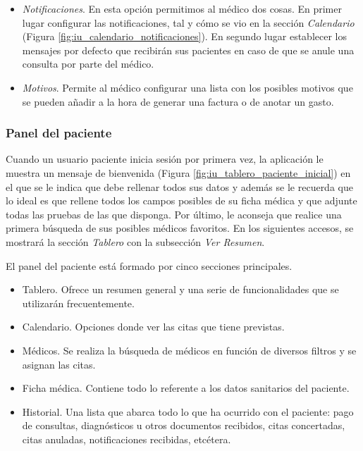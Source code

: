 \documentclass[a4paper,oneside,11pt]{book}
\begin{document}
\begin{itemize}
			\item \textit{Notificaciones}. En esta opción permitimos al médico dos cosas. En primer lugar configurar las notificaciones, tal y cómo se vio en la sección \textit{Calendario} (Figura \ref{fig:iu_calendario_notificaciones}). En segundo lugar establecer los mensajes por defecto que recibirán sus pacientes en caso de que se anule una consulta por parte del médico.
			
			\item \textit{Motivos}. Permite al médico configurar una lista con los posibles motivos que se pueden añadir a la hora de generar una factura o de anotar un gasto.
			
		\end{itemize}
				
		
	

	\subsubsection{Panel del paciente} %
		\label{sub:panel_paciente}
	
		Cuando un usuario paciente inicia sesión por primera vez, la aplicación le muestra un mensaje de bienvenida (Figura \ref{fig:iu_tablero_paciente_inicial}) en el que se le indica que debe rellenar todos sus datos y además se le recuerda que lo ideal es que rellene todos los campos posibles de su ficha médica y que adjunte todas las pruebas de las que disponga. Por último, le aconseja que realice una primera búsqueda de sus posibles médicos favoritos. En los siguientes accesos, se mostrará la sección \textit{Tablero} con la subsección \textit{Ver Resumen}.		
	
		El panel del paciente está formado por cinco secciones principales.
		\begin{itemize}
			\item Tablero. Ofrece un resumen general y una serie de funcionalidades que se utilizarán frecuentemente.
			\item Calendario. Opciones donde ver las citas que tiene previstas.
			\item Médicos. Se realiza la búsqueda de médicos en función de diversos filtros y se asignan las citas.
			\item Ficha médica. Contiene todo lo referente a los datos sanitarios del paciente.
			\item Historial. Una lista que abarca todo lo que ha ocurrido con el paciente: pago de consultas, diagnósticos u otros documentos recibidos, citas concertadas, citas anuladas, notificaciones recibidas, etcétera. 
		\end{itemize}
		
\end{document}
